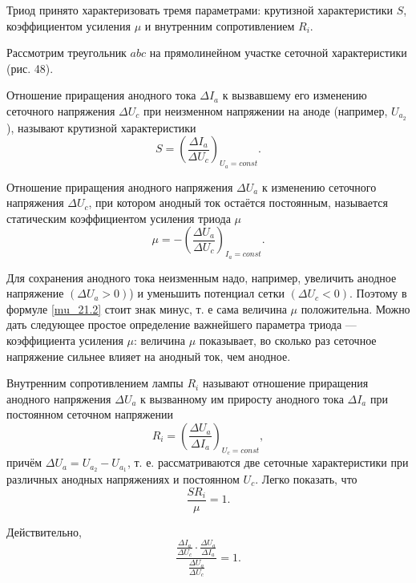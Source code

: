 \documentclass[a4paper,10pt]{book}
\begin{document}
Триод принято характеризовать тремя параметрами: крутизной характеристики $S$, коэффициентом усиления $\mu$ и внутренним сопротивлением $R_i$.

Рассмотрим треугольник $abc$ на прямолинейном участке сеточной характеристики (рис. 48).

Отношение приращения анодного тока $\Delta I_a$ к вызвавшему его изменению сеточного напряжения $\Delta U_c$ при неизменном напряжении на аноде (например, $U_{a_2}$), называют крутизной характеристики
\begin{equation}
S = (\frac{\Delta I_a}{\Delta U_c})_{U_a=const}.
\end{equation}

Отношение приращения анодного напряжения $\Delta U_a$ к изменению сеточного напряжения $\Delta U_c$, при котором анодный ток остаётся постоянным, называется статическим коэффициентом усиления триода $\mu$ \begin{equation}\label{mu_21.2}
\mu = - (\frac{\Delta U_a}{\Delta U_c})_{I_a=const}.
\end{equation}

Для сохранения анодного тока неизменным надо, например, увеличить анодное напряжение $(\Delta U_a > 0)$) и уменьшить потенциал сетки $(\Delta U_c < 0)$. Поэтому в формуле \ref{mu_21.2} стоит знак минус, т. е сама величина $\mu$ положительна. Можно дать следующее простое определение важнейшего параметра триода — коэффициента усиления $\mu$: величина $\mu$ показывает, во сколько раз сеточное напряжение сильнее влияет на анодный ток, чем анодное.

Внутренним сопротивлением лампы $R_i$ называют отношение приращения анодного напряжения $\Delta U_a$ к вызванному им приросту анодного тока $\Delta I_a$ при постоянном сеточном напряжении\begin{equation}\label{21.3}
R_i = (\frac{\Delta U_a}{\Delta I_a})_{U_c=const},
\end{equation}
причём $\Delta U_a = U_{a_2}-U_{a_1}$, т. е. рассматриваются две сеточные характеристики при различных анодных напряжениях и постоянном $U_c$. Легко показать, что\begin{equation}\label{21.4}
\frac{S R_i}{\mu} = 1.
\end{equation}

Действительно, \begin{equation}
\frac{\frac{\Delta I_a}{\Delta U_c}\cdot\frac{\Delta U_a}{\Delta I_a}}{\frac{\Delta U_a}{\Delta U_c}} = 1.\nonumber
\end{equation}
\end{document}
